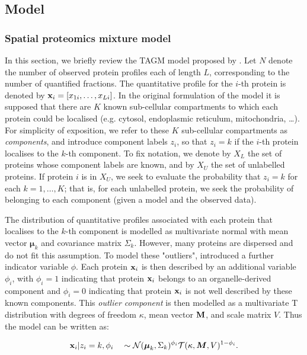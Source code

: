 \documentclass[12pt,english]{article}
\begin{document}
\subsection{Model}
\subsubsection{Spatial proteomics mixture model}
In this section, we briefly review the TAGM model proposed by \cite{Crook:2018}. Let $N$ denote the number of observed protein profiles each of length $L$, corresponding to
the number of quantified fractions. The quantitative profile for the $i$-th protein is denoted by ${\bf x}_i = [x_{1i}, \ldots, x_{Li}]$.  In the original formulation of the model it is supposed that there are $K$
known sub-cellular compartments to which each protein could be localised
(e.g. cytosol, endoplasmic reticulum, mitochondria, \ldots). For simplicity of exposition, we refer to these $K$ sub-cellular compartments as {\em
	components}, and introduce component labels $z_i$, so that $z_i = k$
if the $i$-th protein localises to the $k$-th component. To fix notation, we denote by
$X_L$ the set of proteins whose component labels are known, and by
$X_U$ the set of unlabelled proteins.  If protein $i$ is in $X_U$, we seek to evaluate the probability that $z_i = k$ for each $k = 1, \ldots, K$;
that is, for each unlabelled protein, we seek the probability of
belonging to each component (given a model and the observed data).


The distribution of quantitative profiles associated with each
protein that localises to the $k$-th component is modelled as multivariate normal
with mean vector $\boldsymbol{\mu}_k$ and covariance matrix
$\Sigma_k$. However, many proteins are dispersed and do not fit this assumption. To model these "outliers", \cite{Crook:2018} introduced a further indicator variable $\phi$. Each protein ${\bf x}_i$ is then described by an additional variable $\phi_i$, with $\phi_i = 1$ indicating that protein ${\bf x}_i$ belongs to an
organelle-derived component and $\phi_i = 0$ indicating that protein
${\bf x}_i$ is not well described by these known components. This
\textit{outlier component} is then modelled as a multivariate T distribution with
degrees of freedom $\kappa$, mean vector $\bf{M}$, and scale matrix
$V$. Thus the model can be written as:

\begin{align}
{\bf x}_i | z_i = k, \phi_i \quad \sim \mathcal{N}(\boldsymbol{\mu}_k, \Sigma_k)^{\phi_i}\mathcal{T}(\kappa, \boldsymbol{M}, V)^{1 - \phi_i }.
\end{align}
\end{document}
